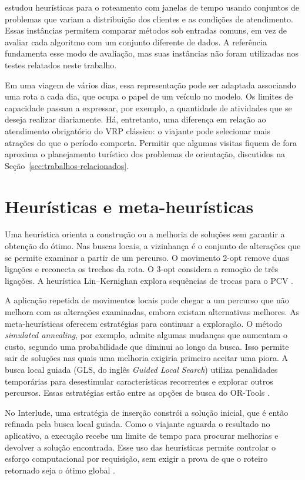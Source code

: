  estudou heurísticas para o roteamento com janelas de tempo usando conjuntos de problemas que variam a distribuição dos clientes e as condições de atendimento. Essas instâncias permitem comparar métodos sob entradas comuns, em vez de avaliar cada algoritmo com um conjunto diferente de dados. A referência fundamenta esse modo de avaliação, mas suas instâncias não foram utilizadas nos testes relatados neste trabalho.

Em uma viagem de vários dias, essa representação pode ser adaptada associando uma rota a cada dia, que ocupa o papel de um veículo no modelo. Os limites de capacidade passam a expressar, por exemplo, a quantidade de atividades que se deseja realizar diariamente. Há, entretanto, uma diferença em relação ao atendimento obrigatório do VRP clássico: o viajante pode selecionar mais atrações do que o período comporta. Permitir que algumas visitas fiquem de fora aproxima o planejamento turístico dos problemas de orientação, discutidos na Seção~\ref{sec:trabalhos-relacionados}.

\section{Heurísticas e meta-heurísticas}

Uma heurística orienta a construção ou a melhoria de soluções sem garantir a obtenção do ótimo. Nas buscas locais, a vizinhança é o conjunto de alterações que se permite examinar a partir de um percurso. O movimento 2-opt remove duas ligações e reconecta os trechos da rota. O 3-opt considera a remoção de três ligações. A heurística Lin--Kernighan explora sequências de trocas para o PCV \cite{applegate2006}.

A aplicação repetida de movimentos locais pode chegar a um percurso que não melhora com as alterações examinadas, embora existam alternativas melhores. As meta-heurísticas oferecem estratégias para continuar a exploração. O método \textit{simulated annealing}, por exemplo, admite algumas mudanças que aumentam o custo, segundo uma probabilidade que diminui ao longo da busca. Isso permite sair de soluções nas quais uma melhoria exigiria primeiro aceitar uma piora. A busca local guiada (GLS, do inglês \textit{Guided Local Search}) utiliza penalidades temporárias para desestimular características recorrentes e explorar outros percursos. Essas estratégias estão entre as opções de busca do OR-Tools \cite{google_routing_options}.

No Interlude, uma estratégia de inserção constrói a solução inicial, que é então refinada pela busca local guiada. Como o viajante aguarda o resultado no aplicativo, a execução recebe um limite de tempo para procurar melhorias e devolver a solução encontrada. Esse uso das heurísticas permite controlar o esforço computacional por requisição, sem exigir a prova de que o roteiro retornado seja o ótimo global \cite{google_routing_options}.

